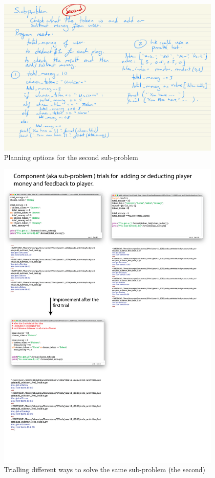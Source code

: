 \documentclass[a4paper,12pt]{article}
\begin{document}
\begin{figure} [!h]
	\centering
	\includegraphics[width=15cm]{iterative_processes/Lucky_Unicorn_Sub_problems_3.pdf}
	\caption*{Planning options for the second sub-problem}
\end{figure}
\newpage

\begin{figure} [!h]
	\centering
	\includegraphics[width=17cm]{iterative_processes/sub_problem_trials_2.png}
	\caption*{Trialling different ways to solve the same sub-problem (the second)}
\end{figure}
\end{document}
